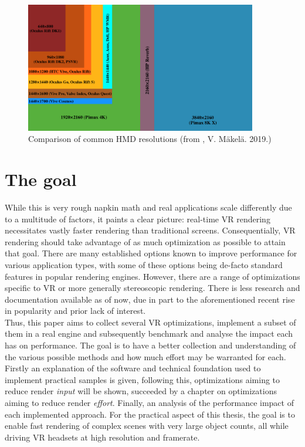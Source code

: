 \begin{figure}[htb]
  \centering
  \includegraphics[width=0.9\textwidth]{pictures/VR_headset_resolution_per_eye_comparison}
  \caption{Comparison of common HMD resolutions (from \cite{VeikkoMakela.2019}, V. Mäkelä. 2019.)} \label{fig:VR_HMD_res}
\end{figure} 

\section{The goal}
While this is very rough napkin math and real applications scale differently due to a multitude of factors, it paints a clear picture: real-time \gls{VR} rendering necessitates vastly faster rendering than traditional screens. Consequentially, \gls{VR} rendering should take advantage of as much optimization as possible to attain that goal. There are many established options known to improve performance for various application types, with some of these options being de-facto standard features in popular rendering engines.  However, there are a range of optimizations specific to \gls{VR} or more generally stereoscopic rendering. There is less research and documentation available as of now, due in part to the aforementioned recent rise in popularity and prior lack of interest. \\
Thus, this paper aims to collect several \gls{VR} optimizations, implement a subset of them in a real engine and subsequently benchmark and analyse the impact each has on performance. The goal is to have a better collection and understanding of the various possible methods and how much effort may be warranted for each. 
Firstly an explanation of the software and technical foundation used to implement practical samples is given, following this, optimizations aiming to reduce render \textit{input} will be shown, succeeded by a chapter on optimizations aiming to reduce render \textit{effort}. Finally, an analysis of the performance impact of each implemented approach. 
For the practical aspect of this thesis, the goal is to enable fast rendering of complex scenes with very large object counts, all while driving \gls{VR} headsets at high resolution and framerate. 

